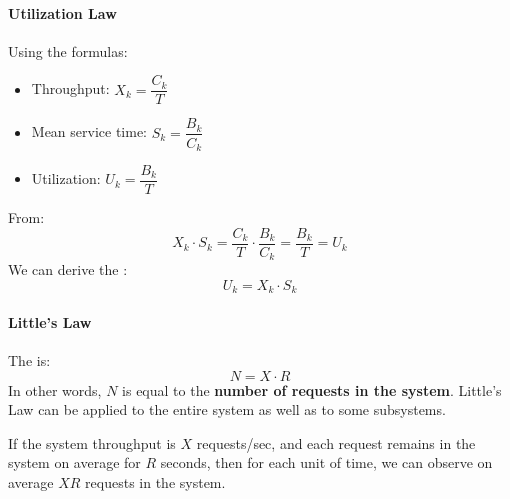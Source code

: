\newpage

\paragraph{Utilization Law}

Using the formulas:
\begin{itemize}
	\item Throughput: $X_{k} = \dfrac{C_{k}}{T}$
	\item Mean service time: $S_{k} = \dfrac{B_{k}}{C_{k}}$
	\item Utilization: $U_{k} = \dfrac{B_{k}}{T}$
\end{itemize}
From:
\begin{equation*}
	X_{k} \cdot S_{k} = \dfrac{C_{k}}{T} \cdot \dfrac{B_{k}}{C_{k}} = \dfrac{B_{k}}{T} = U_{k}
\end{equation*}
We can derive the :
\begin{equation}
	U_{k} = X_{k} \cdot S_{k}
\end{equation}

\longline

\paragraph{Little's Law}

The  is:
\begin{equation}
	N = X \cdot R
\end{equation}
In other words, $N$ is equal to the \textbf{number of requests in the system}. Little's Law can be applied to the entire system as well as to some subsystems.

\highspace
If the system throughput is $X$ requests/sec, and each request remains in the system on average for $R$ seconds, then for each unit of time, we can observe on average $XR$ requests in the system.


